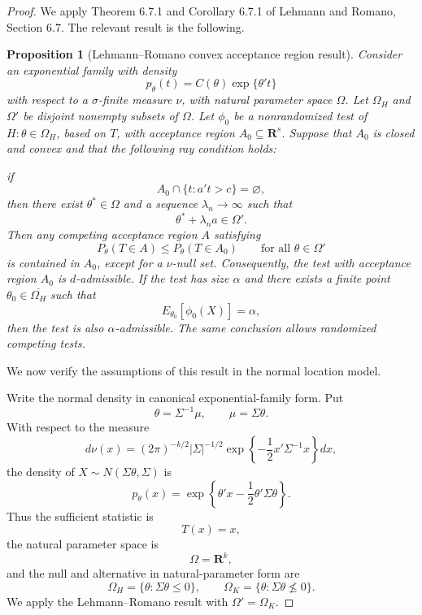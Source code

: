 \documentclass[11pt]{article}
\newtheorem{proposition}{Proposition}
\begin{document}
\begin{proof}
We apply Theorem 6.7.1 and Corollary 6.7.1 of Lehmann and Romano, Section 6.7. The relevant result is the following.

\begin{proposition}[Lehmann--Romano convex acceptance region result]
Consider an exponential family with density
\[
p_\theta(t)=C(\theta)\exp\{\theta't\}
\]
with respect to a \(\sigma\)-finite measure \(\nu\), with natural parameter space \(\Omega\). Let \(\Omega_H\) and \(\Omega'\) be disjoint nonempty subsets of \(\Omega\). Let \(\phi_0\) be a nonrandomized test of \(H:\theta\in\Omega_H\), based on \(T\), with acceptance region \(A_0\subseteq\mathbf R^s\). Suppose that \(A_0\) is closed and convex and that the following ray condition holds:

if
\[
A_0\cap\{t:a't>c\}=\varnothing,
\]
then there exist \(\theta^*\in\Omega\) and a sequence \(\lambda_n\to\infty\) such that
\[
\theta^*+\lambda_n a\in\Omega'.
\]
Then any competing acceptance region \(A\) satisfying
\[
P_\theta(T\in A)\le P_\theta(T\in A_0)
\qquad\text{for all }\theta\in\Omega'
\]
is contained in \(A_0\), except for a \(\nu\)-null set. Consequently, the test with acceptance region \(A_0\) is \(d\)-admissible. If the test has size \(\alpha\) and there exists a finite point \(\theta_0\in\overline{\Omega_H}\) such that
\[
E_{\theta_0}[\phi_0(X)]=\alpha,
\]
then the test is also \(\alpha\)-admissible. The same conclusion allows randomized competing tests.
\end{proposition}

We now verify the assumptions of this result in the normal location model.

Write the normal density in canonical exponential-family form. Put
\[
\theta=\Sigma^{-1}\mu,
\qquad
\mu=\Sigma\theta.
\]
With respect to the measure
\[
d\nu(x)=(2\pi)^{-k/2}|\Sigma|^{-1/2}
\exp\left\{-\frac12 x'\Sigma^{-1}x\right\}dx,
\]
the density of \(X\sim N(\Sigma\theta,\Sigma)\) is
\[
p_\theta(x)=\exp\left\{\theta'x-\frac12\theta'\Sigma\theta\right\}.
\]
Thus the sufficient statistic is
\[
T(x)=x,
\]
the natural parameter space is
\[
\Omega=\mathbf R^k,
\]
and the null and alternative in natural-parameter form are
\[
\Omega_H=\{\theta:\Sigma\theta\le 0\},
\qquad
\Omega_K=\{\theta:\Sigma\theta\not\le 0\}.
\]
We apply the Lehmann--Romano result with \(\Omega'=\Omega_K\).


\end{proof}
\end{document}

